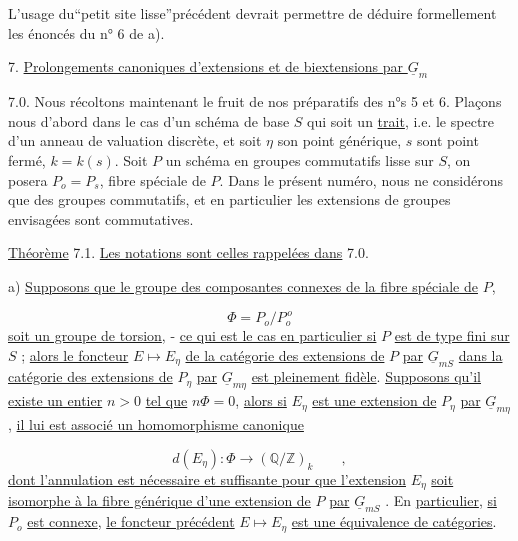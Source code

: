 L'usage du``petit site lisse''précédent devrait permettre de déduire formellement les énoncés du n° 6 de a).




7. \underline{Prolongements canoniques d'extensions et de biextensions par $\underline{G}_m$}

7.0. Nous récoltons maintenant le fruit de nos préparatifs des n°s 5 et 6. Plaçons nous d'abord dans le cas d'un schéma de base $S$ qui soit un \underline{trait}, i.e. le spectre d'un anneau de valuation discrète, et soit $\eta$ son point générique, $s$ sont point fermé, $k = k(s)$. Soit $P$ un schéma en groupes commutatifs lisse sur $S$, on posera $P_o = P_s$, fibre spéciale de $P$. Dans le présent numéro, nous ne considérons que des groupes commutatifs, et en particulier les extensions de groupes envisagées sont commutatives.

\underline{Théorème} 7.1. \underline{Les notations sont celles rappelées dans} 7.0.

a) \underline{Supposons que le groupe des composantes connexes de la fibre spéciale de} $P$,

\begin{equation*}
\Phi = P_o/P_o^{\,o}
\end{equation*}
\underline{soit un groupe de torsion}, - \underline{ce qui est le cas en particulier si} $P$ \underline{est de type fini sur} $S$ ; \underline{alors le foncteur} $E \longmapsto E_\eta$ \underline{de la catégorie des extensions de} $P$ \underline{par} $\underline{G}_{mS}$ \underline{dans la catégorie des extensions de} $P_\eta$ \underline{par} $\underline{G}_{m\eta}$ \underline{est pleinement fidèle}. \underline{Supposons qu'il existe un entier} $n > 0$ \underline{tel que} $n\Phi = 0$, \underline{alors si} $E_\eta$ \underline{est une extension de} $P_\eta$ \underline{par} $\underline{G}_{m\eta}$ , \underline{il lui est associé un homomorphisme canonique}

\begin{equation}\tag{7.1.1}
d(E_\eta) : \Phi \longrightarrow (\mathbb{Q}/\mathbb{Z})_k \qquad ,
\end{equation}
\underline{dont l'annulation est nécessaire et suffisante pour que l'extension} $E_\eta$ \underline{soit isomorphe à la fibre générique d'une extension de} $P$ \underline{par} $\underline{G}_{mS}$ . En \underline{particulier}, \underline{si} $P_o$ \underline{est connexe}, \underline{le foncteur précédent} $E \longmapsto E_\eta$ \underline{est une équivalence de catégories}.


